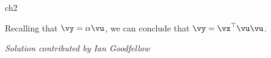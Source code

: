 \begin{problems}{ch2}
\begin{problem}
\begin{solution}
			Recalling that $\vy = \alpha \vu$, we can conclude that $\vy = \vx^\top \vu \vu$.
			
			{\em Solution contributed by Ian Goodfellow}
		\end{solution}
	\end{problem}


	\begin{problem}

		\begin{hint}
		\end{hint}

		\begin{answer}\end{answer}

		\begin{solution}
		\end{solution}
	\end{problem}



	\begin{problem}

		\begin{hint}
		\end{hint}

		\begin{answer}\end{answer}

		\begin{solution}
		\end{solution}
	\end{problem}



	
\end{problems}


